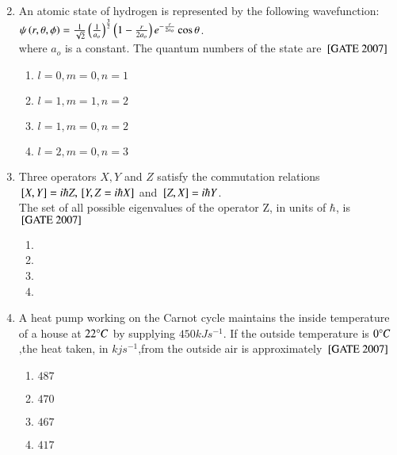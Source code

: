 \documentclass[journal]{IEEEtran}
\begin{document}
\begin{enumerate}
\begin{multicols}{2}
\begin{enumerate}
\end{enumerate}
\end{multicols}
\item An atomic state of hydrogen is represented by the following wavefunction: $\psi\left(r,\theta,\phi\right)= \frac{1}{\sqrt{2}}\left(\frac{1}{a_o}\right)^\frac{3}{2} \left(1-\frac{r}{2a_o}\right)e^{-\frac{r}{2a_o}}\cos{\theta}$.\\
where $a_o$ is a constant. The quantum numbers of the state are
\hfill{${}\left[\text{GATE 2007}\right]$} \begin{multicols}{2}
\begin{enumerate}
    \item $l=0,m=0,n=1$
    \item $l=1,m=1,n=2$\item $l=1,m=0,n=2$\item $l=2,m=0,n=3$
\end{enumerate} 
\end{multicols}
\item Three operators $X,Y$ and $Z$ satisfy the commutation relations ${}\left[X,Y\right]=i\hbar Z,{}\left[Y,Z=i\hbar X\right]$ and ${}\left[Z,X\right]=i\hbar Y$.\\
The set of all possible eigenvalues of the operator Z, in units of $\hbar$, is \hfill{${}\left[\text{GATE 2007}\right]$} 
\begin{multicols}{2}
 \begin{enumerate}
    \item {}
    \item {}
    \item 
    \item {}
\end{enumerate}
\end{multicols}
\item A heat pump working on the Carnot cycle maintains the inside temperature of a house at $22\degree C$ by supplying $450 kJs^{-1}$. If the outside temperature is $0\degree C$,the heat taken, in $kjs^{-1}$,from the outside air is approximately \hfill{${}\left[\text{GATE 2007}\right]$} 
\begin{multicols}{4}
 \begin{enumerate}
    \item $487$
    \item $470$
    \item $467$
    \item $417$

\end{enumerate}
\end{multicols}
\end{enumerate}
\end{document}
